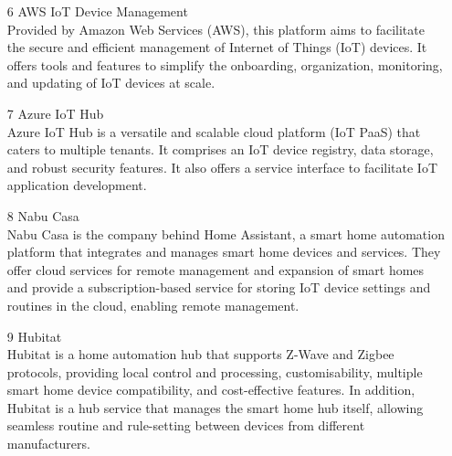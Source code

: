 \documentclass[conference]{IEEEtran}
\begin{document}
\begin{itemize}
\\
\item [6]AWS IoT Device Management\\
Provided by Amazon Web Services (AWS), this platform aims to facilitate the secure and efficient management of Internet of Things (IoT) devices. It offers tools and features to simplify the onboarding, organization, monitoring, and updating of IoT devices at scale.
\\
\item [7]Azure IoT Hub\\
Azure IoT Hub is a versatile and scalable cloud platform (IoT PaaS) that caters to multiple tenants. It comprises an IoT device registry, data storage, and robust security features. It also offers a service interface to facilitate IoT application development.
\\
\item [8]Nabu Casa\\
Nabu Casa is the company behind Home Assistant, a smart home automation platform that integrates and manages smart home devices and services. They offer cloud services for remote management and expansion of smart homes and provide a subscription-based service for storing IoT device settings and routines in the cloud, enabling remote management.
\\
\item [9]Hubitat\\
Hubitat is a home automation hub that supports Z-Wave and Zigbee protocols, providing local control and processing, customisability, multiple smart home device compatibility, and cost-effective features. In addition, Hubitat is a hub service that manages the smart home hub itself, allowing seamless routine and rule-setting between devices from different manufacturers. 
\\
\end{itemize}
\end{document}

